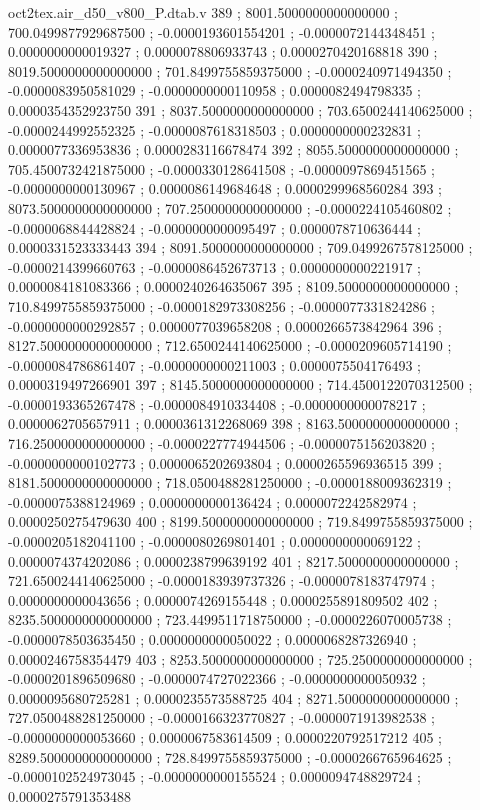 \begin{filecontents}[overwrite]{oct2tex.air_d50_v800_P.dtab.v}
389 ; 8001.5000000000000000 ; 700.0499877929687500 ; -0.0000193601554201 ; -0.0000072144348451 ; 0.0000000000019327 ; 0.0000078806933743 ; 0.0000270420168818
390 ; 8019.5000000000000000 ; 701.8499755859375000 ; -0.0000240971494350 ; -0.0000083950581029 ; -0.0000000000110958 ; 0.0000082494798335 ; 0.0000354352923750
391 ; 8037.5000000000000000 ; 703.6500244140625000 ; -0.0000244992552325 ; -0.0000087618318503 ; 0.0000000000232831 ; 0.0000077336953836 ; 0.0000283116678474
392 ; 8055.5000000000000000 ; 705.4500732421875000 ; -0.0000330128641508 ; -0.0000097869451565 ; -0.0000000000130967 ; 0.0000086149684648 ; 0.0000299968560284
393 ; 8073.5000000000000000 ; 707.2500000000000000 ; -0.0000224105460802 ; -0.0000068844428824 ; -0.0000000000095497 ; 0.0000078710636444 ; 0.0000331523333443
394 ; 8091.5000000000000000 ; 709.0499267578125000 ; -0.0000214399660763 ; -0.0000086452673713 ; 0.0000000000221917 ; 0.0000084181083366 ; 0.0000240264635067
395 ; 8109.5000000000000000 ; 710.8499755859375000 ; -0.0000182973308256 ; -0.0000077331824286 ; -0.0000000000292857 ; 0.0000077039658208 ; 0.0000266573842964
396 ; 8127.5000000000000000 ; 712.6500244140625000 ; -0.0000209605714190 ; -0.0000084786861407 ; -0.0000000000211003 ; 0.0000075504176493 ; 0.0000319497266901
397 ; 8145.5000000000000000 ; 714.4500122070312500 ; -0.0000193365267478 ; -0.0000084910334408 ; -0.0000000000078217 ; 0.0000062705657911 ; 0.0000361312268069
398 ; 8163.5000000000000000 ; 716.2500000000000000 ; -0.0000227774944506 ; -0.0000075156203820 ; -0.0000000000102773 ; 0.0000065202693804 ; 0.0000265596936515
399 ; 8181.5000000000000000 ; 718.0500488281250000 ; -0.0000188009362319 ; -0.0000075388124969 ; 0.0000000000136424 ; 0.0000072242582974 ; 0.0000250275479630
400 ; 8199.5000000000000000 ; 719.8499755859375000 ; -0.0000205182041100 ; -0.0000080269801401 ; 0.0000000000069122 ; 0.0000074374202086 ; 0.0000238799639192
401 ; 8217.5000000000000000 ; 721.6500244140625000 ; -0.0000183939737326 ; -0.0000078183747974 ; 0.0000000000043656 ; 0.0000074269155448 ; 0.0000255891809502
402 ; 8235.5000000000000000 ; 723.4499511718750000 ; -0.0000226070005738 ; -0.0000078503635450 ; 0.0000000000050022 ; 0.0000068287326940 ; 0.0000246758354479
403 ; 8253.5000000000000000 ; 725.2500000000000000 ; -0.0000201896509680 ; -0.0000074727022366 ; -0.0000000000050932 ; 0.0000095680725281 ; 0.0000235573588725
404 ; 8271.5000000000000000 ; 727.0500488281250000 ; -0.0000166323770827 ; -0.0000071913982538 ; -0.0000000000053660 ; 0.0000067583614509 ; 0.0000220792517212
405 ; 8289.5000000000000000 ; 728.8499755859375000 ; -0.0000266765964625 ; -0.0000102524973045 ; -0.0000000000155524 ; 0.0000094748829724 ; 0.0000275791353488

\end{filecontents}
